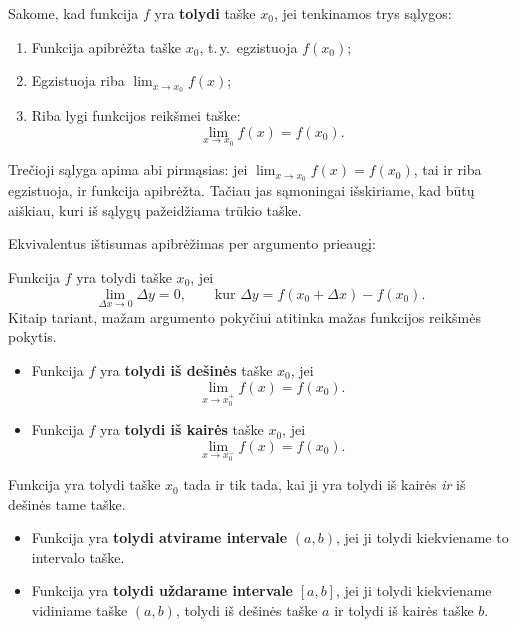 \begin{definition}
Sakome, kad funkcija $f$ yra \textbf{tolydi} taške $x_0$, jei tenkinamos
trys sąlygos:
\begin{enumerate}
  \item Funkcija apibrėžta taške $x_0$, t.\,y.\ egzistuoja $f(x_0)$;
  \item Egzistuoja riba $\displaystyle\lim_{x \to x_0} f(x)$;
  \item Riba lygi funkcijos reikšmei taške:
        \[
            \lim_{x \to x_0} f(x) = f(x_0).
        \]
\end{enumerate}
\end{definition}

\begin{remark}
Trečioji sąlyga apima abi pirmąsias: jei $\lim_{x\to x_0}f(x)=f(x_0)$,
tai ir riba egzistuoja, ir funkcija apibrėžta. Tačiau jas sąmoningai
išskiriame, kad būtų aiškiau, kuri iš sąlygų pažeidžiama trūkio taške.
\end{remark}

Ekvivalentus ištisumas apibrėžimas per argumento prieaugį:

\begin{definition}
Funkcija $f$ yra tolydi taške $x_0$, jei
\[
    \lim_{\Delta x \to 0} \Delta y = 0,
    \qquad \text{kur } \Delta y = f(x_0+\Delta x)-f(x_0).
\]
Kitaip tariant, mažam argumento pokyčiui atitinka mažas funkcijos
reikšmės pokytis.
\end{definition}

\begin{definition}
\begin{itemize}
  \item Funkcija $f$ yra \textbf{tolydi iš dešinės} taške $x_0$, jei
        \[
            \lim_{x \to x_0^+} f(x) = f(x_0).
        \]
  \item Funkcija $f$ yra \textbf{tolydi iš kairės} taške $x_0$, jei
        \[
            \lim_{x \to x_0^-} f(x) = f(x_0).
        \]
\end{itemize}
Funkcija yra tolydi taške $x_0$ tada ir tik tada, kai ji yra tolydi iš
kairės \textit{ir} iš dešinės tame taške.
\end{definition}

\begin{definition}
\begin{itemize}
  \item Funkcija yra \textbf{tolydi atvirame intervale} $(a,b)$, jei ji
        tolydi kiekviename to intervalo taške.
  \item Funkcija yra \textbf{tolydi uždarame intervale} $[a,b]$, jei ji
        tolydi kiekviename vidiniame taške $(a,b)$, tolydi iš dešinės
        taške $a$ ir tolydi iš kairės taške $b$.
\end{itemize}
\end{definition}

